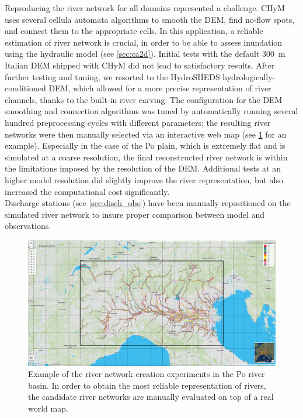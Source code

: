 Reproducing the river network for all domains represented a challenge.
CHyM uses several cellula automata algorithms to smooth the DEM, find no-flow spots, and connect them to the appropriate cells.
In this application, a reliable estimation of river network is crucial, in order to be able to assess inundation using the hydraulic model (see \cref{sec:ca2d}).
Initial tests with the default \SI{300}{\meter} Italian DEM shipped with CHyM did not lead to satisfactory results.
After further testing and tuning, we resorted to the HydroSHEDS hydrologically-conditioned DEM, which allowed for a more precise representation of river channels, thanks to the built-in river carving.
The configuration for the DEM smoothing and connection algorithms was tuned by automatically running several hundred preprocessing cycles with different parameters; the resulting river networks were then manually selected via an interactive web map (see \cref{fig:river_network} for an example).
Especially in the case of the Po plain, which is extremely flat and is simulated at a coarse resolution, the final reconstructed river network is within the limitations imposed by the resolution of the DEM.
Additional tests at an higher model resolution did slightly improve the river representation, but also increased the computational cost significantly.\\
Discharge stations (see \cref{sec:disch_obs}) have been manually repositioned on the simulated river network to insure proper comparison between model and observations.
\begin{figure}
    \centering
    \includegraphics[width=\textheight]{figures/chym_routing_po}
    \decoRule
    \caption[Example river networks in the Po river basin]{
        Example of the river network creation experiments in the Po river basin. In order to obtain the most reliable representation of rivers, the candidate river networks are manually evaluated on top of a real world map.
    } \label{fig:river_network}
\end{figure}


